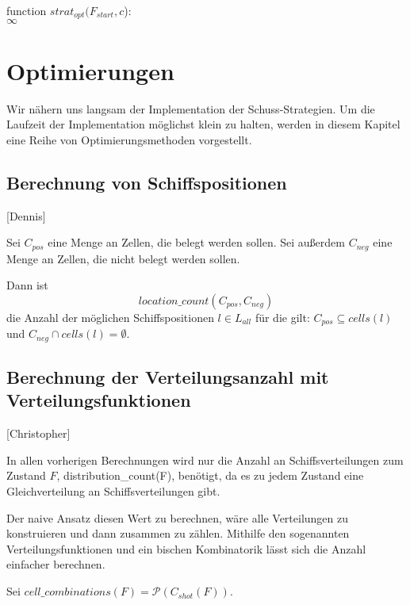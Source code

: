 \documentclass[a4paper,12pt]{llncs}
\numberwithin{equation}{section}
\begin{document}
\begin{algorithm}[H]
 function $strat_{opt}(F_{start}, c$):\\
   \Return $\infty$ \;
\end{algorithm}






\newpage

\section{Optimierungen}

Wir nähern uns langsam der Implementation der Schuss-Strategien.
Um die Laufzeit der Implementation möglichst klein zu halten, werden in diesem Kapitel eine Reihe von Optimierungsmethoden vorgestellt.

\subsection{Berechnung von Schiffspositionen}[Dennis]
\begin{definition}
Sei $C_{pos}$ eine Menge an Zellen, die belegt werden sollen. Sei außerdem $C_{neg}$ eine Menge an Zellen, die nicht belegt werden sollen.

Dann ist
\[
location\_count(C_{pos}, C_{neg})
\]
die Anzahl der möglichen Schiffspositionen $l \in L_{all}$ für die gilt: $C_{pos} \subseteq cells(l)$ und $C_{neg} \cap cells(l) = \emptyset$.
\end{definition}

\subsection{Berechnung der Verteilungsanzahl mit Verteilungsfunktionen}[Christopher]

In allen vorherigen Berechnungen wird nur die Anzahl an Schiffsverteilungen zum Zustand $F$, distribution\_count(F), benötigt, da es zu jedem Zustand eine Gleichverteilung an Schiffsverteilungen gibt.

Der naive Ansatz diesen Wert zu berechnen, wäre alle Verteilungen zu konstruieren und dann zusammen zu zählen.
Mithilfe den sogenannten Verteilungsfunktionen und ein bischen Kombinatorik lässt sich die Anzahl einfacher berechnen.

\begin{definition}
Sei $cell\_combinations(F)=\mathcal{P}(C_{shot}(F))$.
\end{definition}
\end{document}
